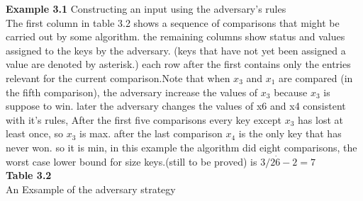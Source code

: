 \documentclass[a4paper,10pt,titlepage]{report}
\begin{document}
\vspace{5mm}
\textbf{Example 3.1} Constructing an input using the adversary's rules\\
\vspace{5mm}
The first column in table 3.2 shows a sequence of comparisons that might be carried out by some algorithm. the remaining columns show status and values assigned to the keys by the adversary. (keys that have not yet been assigned a value are denoted by asterisk.) each row after the first contains only the entries relevant for the current comparison.Note that when $x_3$ and $x_1$ are compared (in the fifth comparison), the adversary increase the values of $x_3$ because $x_3$ is suppose to win. later the adversary changes the values of x6 and x4 consistent with it's rules, After the first five comparisons every key except $x_3$ has lost at least once, so $x_3$ is max. after the last comparison $x_4$ is the only key that has never won. so it is min, in this example the algorithm did eight comparisons, the worst case lower bound for size keys.(still to be proved) is $3/2\dot 6 -2 = 7$\\
\vspace{5mm}
\textbf{Table 3.2}\\
An Exsample of the adversary strategy\\
\end{document}
